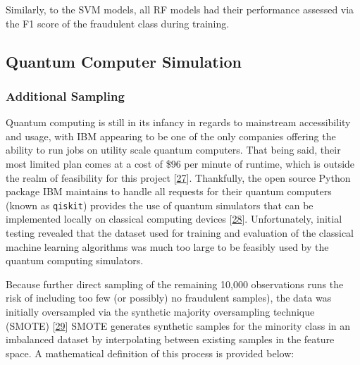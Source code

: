 \documentclass[11pt, oneside]{article}   	%
\begin{document}
Similarly, to the SVM models, all RF models had their performance assessed via the F1 score of the fraudulent class during training.  




\subsection{Quantum Computer Simulation}




\subsubsection{Additional Sampling}

Quantum computing is still in its infancy in regards to mainstream accessibility and usage, with IBM appearing to be one of the only companies offering the ability to run jobs on utility scale quantum computers. That being said, their most limited plan comes at a cost of \$96 per minute of runtime, which is outside the realm of feasibility for this project [\href{https://www.ibm.com/quantum/pricing}{27}]. Thankfully, the open source Python package IBM maintains to handle all requests for their quantum computers (known as \texttt{qiskit}) provides the use of quantum simulators that can be implemented locally on classical computing devices [\href{https://doi.org/10.48550/arXiv.2405.08810}{28}]. Unfortunately, initial testing revealed that the dataset used for training and evaluation of the classical machine learning algorithms was much too large to be feasibly used by the quantum computing simulators. 

Because further direct sampling of the remaining 10,000 observations runs the risk of including too few (or possibly) no fraudulent samples), the data was initially oversampled via the synthetic majority oversampling technique (SMOTE) [\href{https://doi.org/10.1613/jair.953}{29}] SMOTE generates synthetic samples for the minority class in an imbalanced dataset by interpolating between existing samples in the feature space. A mathematical definition of this process is provided below:
\end{document}
